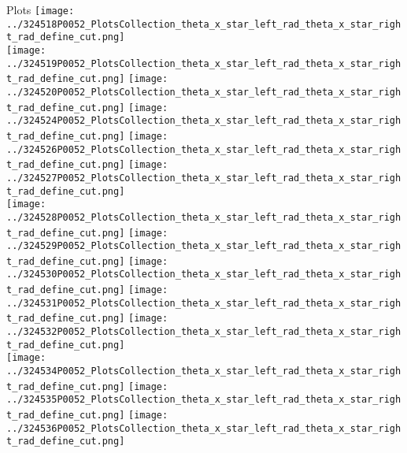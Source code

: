 \documentclass{beamer}
\begin{document}
\begin{frame}
\begin{block}{Plots}
                \texttt{[image: ../324518P0052\_PlotsCollection\_theta\_x\_star\_left\_rad\_theta\_x\_star\_right\_rad\_define\_cut.png]}\\
                \texttt{[image: ../324519P0052\_PlotsCollection\_theta\_x\_star\_left\_rad\_theta\_x\_star\_right\_rad\_define\_cut.png]}
                \texttt{[image: ../324520P0052\_PlotsCollection\_theta\_x\_star\_left\_rad\_theta\_x\_star\_right\_rad\_define\_cut.png]}
                \texttt{[image: ../324524P0052\_PlotsCollection\_theta\_x\_star\_left\_rad\_theta\_x\_star\_right\_rad\_define\_cut.png]}
                \texttt{[image: ../324526P0052\_PlotsCollection\_theta\_x\_star\_left\_rad\_theta\_x\_star\_right\_rad\_define\_cut.png]}
                \texttt{[image: ../324527P0052\_PlotsCollection\_theta\_x\_star\_left\_rad\_theta\_x\_star\_right\_rad\_define\_cut.png]}\\
                \texttt{[image: ../324528P0052\_PlotsCollection\_theta\_x\_star\_left\_rad\_theta\_x\_star\_right\_rad\_define\_cut.png]}
                \texttt{[image: ../324529P0052\_PlotsCollection\_theta\_x\_star\_left\_rad\_theta\_x\_star\_right\_rad\_define\_cut.png]}
                \texttt{[image: ../324530P0052\_PlotsCollection\_theta\_x\_star\_left\_rad\_theta\_x\_star\_right\_rad\_define\_cut.png]}
                \texttt{[image: ../324531P0052\_PlotsCollection\_theta\_x\_star\_left\_rad\_theta\_x\_star\_right\_rad\_define\_cut.png]}
                \texttt{[image: ../324532P0052\_PlotsCollection\_theta\_x\_star\_left\_rad\_theta\_x\_star\_right\_rad\_define\_cut.png]}\\
                \texttt{[image: ../324534P0052\_PlotsCollection\_theta\_x\_star\_left\_rad\_theta\_x\_star\_right\_rad\_define\_cut.png]}
                \texttt{[image: ../324535P0052\_PlotsCollection\_theta\_x\_star\_left\_rad\_theta\_x\_star\_right\_rad\_define\_cut.png]}
                \texttt{[image: ../324536P0052\_PlotsCollection\_theta\_x\_star\_left\_rad\_theta\_x\_star\_right\_rad\_define\_cut.png]}

        \end{block}
\end{frame}
\end{document}
